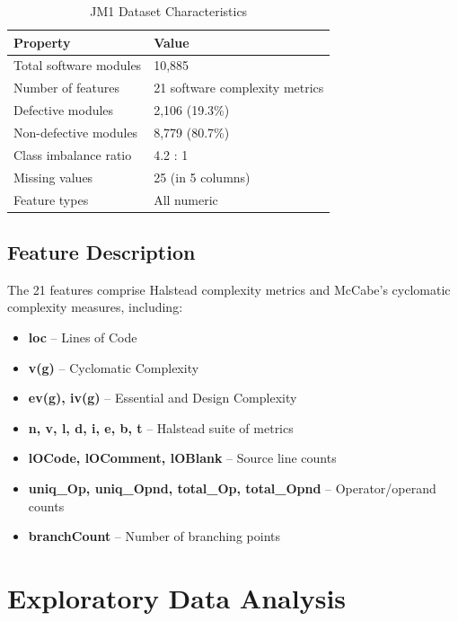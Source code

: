 \documentclass[12pt,a4paper]{article}
\begin{document}
\begin{table}[H]
  \centering
  \caption{JM1 Dataset Characteristics}
  \begin{tabular}{ll}
    \toprule
    \textbf{Property}       & \textbf{Value} \\
    \midrule
    Total software modules  & 10,885 \\
    Number of features      & 21 software complexity metrics \\
    Defective modules       & 2,106 (19.3\%) \\
    Non-defective modules   & 8,779 (80.7\%) \\
    Class imbalance ratio   & 4.2 : 1 \\
    Missing values          & 25 (in 5 columns) \\
    Feature types           & All numeric \\
    \bottomrule
  \end{tabular}
\end{table}

\subsection{Feature Description}

The 21 features comprise Halstead complexity metrics and McCabe's
cyclomatic complexity measures, including:

\begin{itemize}[leftmargin=1.5cm]
  \item \textbf{loc} -- Lines of Code
  \item \textbf{v(g)} -- Cyclomatic Complexity
  \item \textbf{ev(g), iv(g)} -- Essential and Design Complexity
  \item \textbf{n, v, l, d, i, e, b, t} -- Halstead suite of metrics
  \item \textbf{lOCode, lOComment, lOBlank} -- Source line counts
  \item \textbf{uniq\_Op, uniq\_Opnd, total\_Op, total\_Opnd} -- Operator/operand counts
  \item \textbf{branchCount} -- Number of branching points
\end{itemize}

\section{Exploratory Data Analysis}
\end{document}
